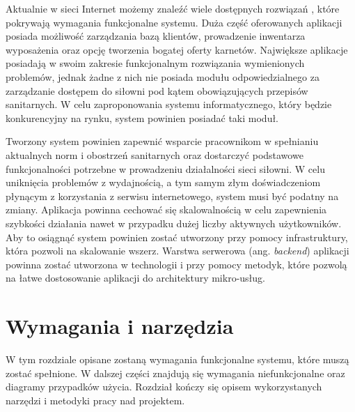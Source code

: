 \documentclass[a4paper,twoside,12pt]{book}
\newcommand{\obcy}[1]{\emph{#1}}
\newcommand{\ang}[1]{{\selectlanguage{british}\obcy{#1}}}
\begin{document}
Aktualnie w sieci Internet możemy znaleźć wiele dostępnych rozwiązań \cite{bib:perfectgym} \cite{bib:wodguru}, które pokrywają wymagania funkcjonalne systemu. Duża część oferowanych aplikacji posiada możliwość zarządzania bazą klientów, prowadzenie inwentarza wyposażenia oraz opcję tworzenia bogatej oferty karnetów. Największe aplikacje posiadają w swoim zakresie funkcjonalnym rozwiązania wymienionych problemów, jednak żadne z nich nie posiada modułu odpowiedzialnego za zarządzanie dostępem do siłowni pod kątem obowiązujących przepisów sanitarnych. W celu zaproponowania systemu informatycznego, który będzie konkurencyjny na rynku, system powinien posiadać taki moduł.

Tworzony system powinien zapewnić wsparcie pracownikom w spełnianiu aktualnych norm i obostrzeń sanitarnych oraz dostarczyć podstawowe funkcjonalności potrzebne w prowadzeniu działalności sieci siłowni. W celu uniknięcia problemów z wydajnością, a tym samym złym doświadczeniom płynącym z korzystania z serwisu internetowego, system musi być podatny na zmiany. Aplikacja powinna cechować się skalowalnością w celu zapewnienia szybkości działania nawet w przypadku dużej liczby aktywnych użytkowników. Aby to osiągnąć system powinien zostać utworzony przy pomocy infrastruktury, która pozwoli na skalowanie wszerz. Warstwa serwerowa (ang. \ang{backend}) aplikacji powinna zostać utworzona w technologii i przy pomocy metodyk, które pozwolą na łatwe dostosowanie aplikacji do architektury mikro-usług.

\chapter{Wymagania i narzędzia}
W tym rozdziale opisane zostaną wymagania funkcjonalne systemu, które muszą zostać spełnione. W dalszej części znajdują się wymagania niefunkcjonalne oraz diagramy przypadków użycia. Rozdział kończy się opisem wykorzystanych narzędzi i metodyki pracy nad projektem.
\end{document}
